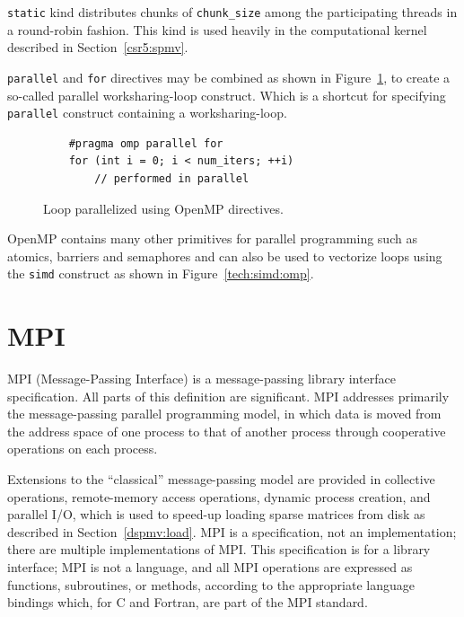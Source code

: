 \documentclass[thesis=M,english]{FITthesis}[2019/12/23]
\begin{document}
\texttt{static} kind distributes chunks of \texttt{chunk\_size} among the participating threads in a
round-robin fashion. This kind is used heavily in the computational kernel described in Section~\ref{csr5:spmv}.

\texttt{parallel} and \texttt{for} directives may be combined as shown in Figure~\ref{tech:omp:loop},
to create a so-called parallel worksharing-loop construct. Which is a shortcut for specifying
\texttt{parallel} construct containing a worksharing-loop.

\begin{figure}[htp]
    \begin{verbatim}
    #pragma omp parallel for
    for (int i = 0; i < num_iters; ++i)
        // performed in parallel
    \end{verbatim}
    \caption{Loop parallelized using OpenMP directives.}\label{tech:omp:loop}
\end{figure}


OpenMP contains many other primitives for parallel programming such as atomics, barriers
and semaphores and can also be used to vectorize loops using the \texttt{simd} construct as shown
in Figure~\ref{tech:simd:omp}.

\vfil\pagebreak

\section{MPI}\label{tech:mpi}

MPI (Message-Passing Interface) is a message-passing library interface specifica\-tion.
All parts of this definition are significant. MPI addresses primarily the message-passing parallel
programming model, in which data is moved from the address space of one process to
that of another process through cooperative operations on each process.

Extensions to the
“classical” message-passing model are provided in collective operations, remote-memory
access operations, dynamic process creation, and parallel I/O, which is used to speed-up loading
sparse matrices from disk as described in Section~\ref{dspmv:load}. MPI is a specification, not
an implementation; there are multiple implementations of MPI\@. This specification is for a
library interface; MPI is not a language, and all MPI operations are expressed as functions,
subroutines, or methods, according to the appropriate language bindings which, for C and
Fortran, are part of the MPI standard.
\cite{mpi40}
\end{document}
